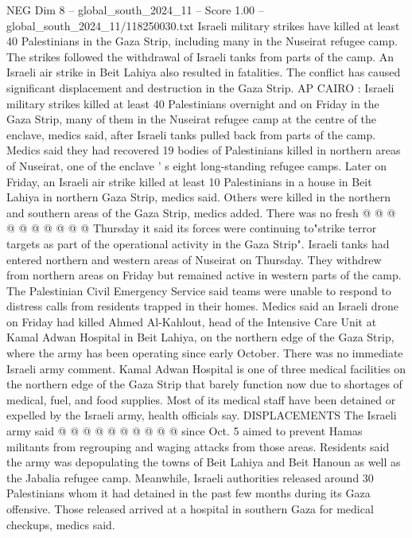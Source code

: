 \begin{textsample}{NEG Dim 8 – global\_south\_2024\_11 – Score 1.00 – global\_south\_2024\_11/118250030.txt}  \label{ex:f8_neg_296}
Israeli military strikes have killed at least 40 Palestinians in the Gaza Strip, including many in the Nuseirat refugee camp.
The strikes followed the withdrawal of Israeli tanks from parts of the camp.
An Israeli air strike in Beit Lahiya also resulted in fatalities.
The conflict has caused significant displacement and destruction in the Gaza Strip.
AP CAIRO : Israeli military strikes killed at least 40 Palestinians overnight and on Friday in the Gaza Strip, many of them in the Nuseirat refugee camp at the centre of the enclave, medics said, after Israeli tanks pulled back from parts of the camp.
Medics said they had recovered 19 bodies of Palestinians killed in northern areas of Nuseirat, one of the enclave ' s eight long-standing refugee camps.
Later on Friday, an Israeli air strike killed at least 10 Palestinians in a house in Beit Lahiya in northern Gaza Strip, medics said.
Others were killed in the northern and southern areas of the Gaza Strip, medics added.
There was no fresh @ @ @ @ @ @ @ @ @ @ Thursday it said its forces were continuing to"strike terror targets as part of the operational activity in the Gaza Strip".
Israeli tanks had entered northern and western areas of Nuseirat on Thursday.
They withdrew from northern areas on Friday but remained active in western parts of the camp.
The Palestinian Civil Emergency Service said teams were unable to respond to distress calls from residents trapped in their homes.
Medics said an Israeli drone on Friday had killed Ahmed Al-Kahlout, head of the Intensive Care Unit at Kamal Adwan Hospital in Beit Lahiya, on the northern edge of the Gaza Strip, where the army has been operating since early October.
There was no immediate Israeli army comment.
Kamal Adwan Hospital is one of three medical facilities on the northern edge of the Gaza Strip that barely function now due to shortages of medical, fuel, and food supplies.
Most of its medical staff have been detained or expelled by the Israeli army, health officials say.
DISPLACEMENTS The Israeli army said @ @ @ @ @ @ @ @ @ @ since Oct. 5 aimed to prevent Hamas militants from regrouping and waging attacks from those areas.
Residents said the army was depopulating the towns of Beit Lahiya and Beit Hanoun as well as the Jabalia refugee camp.
Meanwhile, Israeli authorities released around 30 Palestinians whom it had detained in the past few months during its Gaza offensive.
Those released arrived at a hospital in southern Gaza for medical checkups, medics said.

\end{textsample}
